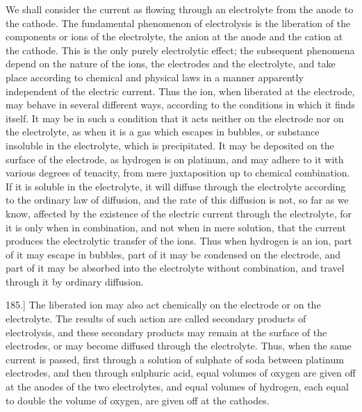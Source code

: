 \documentclass[12pt,oneside]{book}[2021/10/04]
\newcommand{\Runhead}[1]{\fancyhead[C]{\iffloatpage{}{\small#1}}}
\newcommand{\article}[1]{\phantomsection \label{art:#1}{#1.]}}
\newcommand{\¬}{\hphantom{0}}
\begin{document}
We shall consider the current as flowing through an electrolyte
from the anode to the cathode. The fundamental phenomenon of
electrolysis is the liberation of the components or ions of the electrolyte,
the anion at the anode and the cation at the cathode. This is
the only purely electrolytic effect; the subsequent phenomena
depend on the nature of the ions, the electrodes and the electrolyte,
and take place according to chemical and physical laws in a manner
apparently independent of the electric current. Thus the ion, when
liberated at the electrode, may behave in several different ways,
according to the conditions in which it finds itself. It may be in
such a condition that it acts neither on the electrode nor on the
electrolyte, as when it is a gas which escapes in bubbles, or substance
insoluble in the electrolyte, which is precipitated. It may
be deposited on the surface of the electrode, as hydrogen is on
platinum, and may adhere to it with various degrees of tenacity,
from mere juxtaposition up to chemical combination. If it is
soluble in the electrolyte, it will diffuse through the electrolyte
according to the ordinary law of diffusion, and the rate of this
diffusion is not, so far as we know, affected by the existence of the
electric current through the electrolyte, for it is only when in combination,
and not when in mere solution, that the current produces
the electrolytic transfer of the ions. Thus when hydrogen is an
ion, part of it may escape in bubbles, part of it may be condensed
on the electrode, and part of it may be absorbed into the electrolyte
without combination, and travel through it by ordinary
diffusion.
\Runhead{E. M. F. BETWEEN METAL AND ELECTROLYTE.}

\article{185} The liberated ion may also act chemically on the electrode
or on the electrolyte. The results of such action are called
secondary products of electrolysis, and these secondary products may
remain at the surface of the electrodes, or may become diffused
through the electrolyte. Thus, when the same current is passed,
first through a solution of sulphate of soda between platinum electrodes,
and then through sulphuric acid, equal volumes of oxygen
are given off at the anodes of the two electrolytes, and equal
volumes of hydrogen, each equal to double the volume of oxygen,
are given off at the cathodes.
\end{document}
